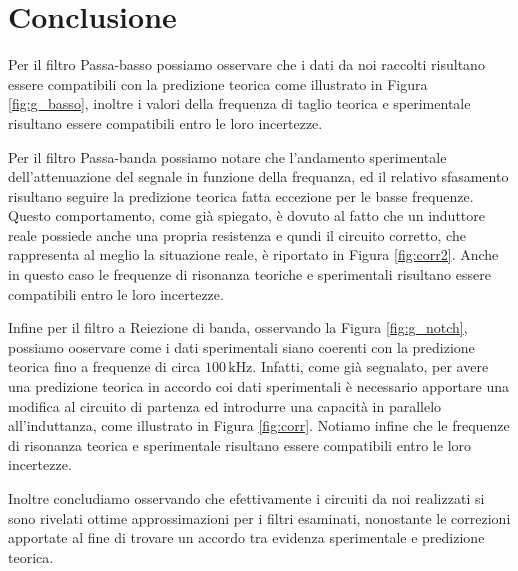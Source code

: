 \section*{Conclusione}

Per il filtro Passa-basso possiamo osservare che i dati da noi raccolti risultano essere compatibili con la predizione teorica come illustrato in Figura \ref{fig:g_basso}, inoltre i valori della frequenza di taglio teorica e sperimentale risultano essere compatibili entro le loro incertezze.

Per il filtro Passa-banda possiamo notare che l'andamento sperimentale dell'attenuazione del segnale in funzione della frequanza, ed il relativo sfasamento risultano seguire la predizione teorica fatta eccezione per le basse frequenze. Questo comportamento, come già spiegato, è dovuto al fatto che un induttore reale possiede anche una propria resistenza e qundi il circuito corretto, che rappresenta al meglio la situazione reale, è riportato in Figura \ref{fig:corr2}. Anche in questo caso le frequenze di risonanza teoriche e sperimentali risultano essere compatibili entro le loro incertezze.

Infine per il filtro a Reiezione di banda, osservando la Figura \ref{fig:g_notch}, possiamo ooservare come i dati sperimentali siano coerenti con la predizione teorica fino a frequenze di circa $100\,\si{\kilo\hertz}$. Infatti, come già segnalato, per avere una predizione teorica in accordo coi dati sperimentali è necessario apportare una modifica al circuito di partenza ed introdurre una capacità in parallelo all'induttanza, come illustrato in Figura \ref{fig:corr}. Notiamo infine che le frequenze di risonanza teorica e sperimentale risultano essere compatibili entro le loro incertezze.

Inoltre concludiamo osservando che efettivamente i circuiti da noi realizzati si sono rivelati ottime approssimazioni per i filtri esaminati, nonostante le correzioni apportate al fine di trovare un accordo tra evidenza sperimentale e predizione teorica.
